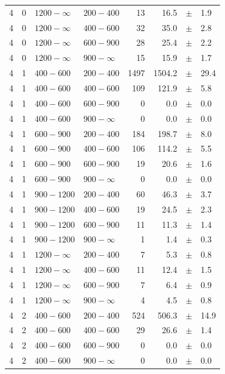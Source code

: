 \begin{table}[!h]
\begin{tabular}{rrllrrcl}
4 & 0 & $1200- \infty$ & $200-400$ &     13 &     16.5 &$\pm$&    1.9 \\
4 & 0 & $1200- \infty$ & $400-600$ &     32 &     35.0 &$\pm$&    2.8 \\
4 & 0 & $1200- \infty$ & $600-900$ &     28 &     25.4 &$\pm$&    2.2 \\
4 & 0 & $1200- \infty$ & $900-\infty$ &     15 &     15.9 &$\pm$&    1.7 \\
4 & 1 & $ 400- 600$ & $200-400$ &   1497 &   1504.2 &$\pm$&   29.4 \\
4 & 1 & $ 400- 600$ & $400-600$ &    109 &    121.9 &$\pm$&    5.8 \\
4 & 1 & $ 400- 600$ & $600-900$ &      0 &      0.0 &$\pm$&    0.0 \\
4 & 1 & $ 400- 600$ & $900-\infty$ &      0 &      0.0 &$\pm$&    0.0 \\
4 & 1 & $ 600- 900$ & $200-400$ &    184 &    198.7 &$\pm$&    8.0 \\
4 & 1 & $ 600- 900$ & $400-600$ &    106 &    114.2 &$\pm$&    5.5 \\
4 & 1 & $ 600- 900$ & $600-900$ &     19 &     20.6 &$\pm$&    1.6 \\
4 & 1 & $ 600- 900$ & $900-\infty$ &      0 &      0.0 &$\pm$&    0.0 \\
4 & 1 & $ 900-1200$ & $200-400$ &     60 &     46.3 &$\pm$&    3.7 \\
4 & 1 & $ 900-1200$ & $400-600$ &     19 &     24.5 &$\pm$&    2.3 \\
4 & 1 & $ 900-1200$ & $600-900$ &     11 &     11.3 &$\pm$&    1.4 \\
4 & 1 & $ 900-1200$ & $900-\infty$ &      1 &      1.4 &$\pm$&    0.3 \\
4 & 1 & $1200- \infty$ & $200-400$ &      7 &      5.3 &$\pm$&    0.8 \\
4 & 1 & $1200- \infty$ & $400-600$ &     11 &     12.4 &$\pm$&    1.5 \\
4 & 1 & $1200- \infty$ & $600-900$ &      7 &      6.4 &$\pm$&    0.9 \\
4 & 1 & $1200- \infty$ & $900-\infty$ &      4 &      4.5 &$\pm$&    0.8 \\
4 & 2 & $ 400- 600$ & $200-400$ &    524 &    506.3 &$\pm$&   14.9 \\
4 & 2 & $ 400- 600$ & $400-600$ &     29 &     26.6 &$\pm$&    1.4 \\
4 & 2 & $ 400- 600$ & $600-900$ &      0 &      0.0 &$\pm$&    0.0 \\
4 & 2 & $ 400- 600$ & $900-\infty$ &      0 &      0.0 &$\pm$&    0.0 \\

\end{tabular}
\end{table}
